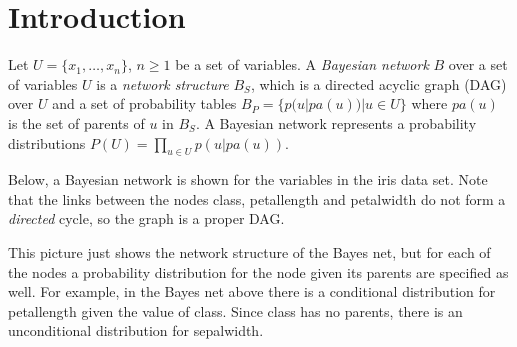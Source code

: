 %
%
%
%


\section{Introduction}

Let $U=\{x_1,\ldots,x_n\}$, $n\ge 1$ be a set of variables.
%
A {\em Bayesian network} $B$ over a set of variables $U$ is a {\em
network  structure} $B_S$, which is a directed acyclic graph (DAG)
over $U$ and a set of  probability tables $B_P = \{p(u|pa(u)) | u\in
U\}$ where $pa(u)$ is the set of parents of $u$ in $B_S$. A Bayesian
network represents a probability distributions $P(U) = \prod_{u\in
U}p(u|pa(u))$.

Below, a Bayesian network is shown for the variables in the iris data set.
Note that the links between the nodes class, petallength and petalwidth 
do not form a {\em directed} cycle, so the graph is a proper DAG.


\begin{center}
\end{center}

This picture just shows the network structure of the Bayes net, but for
each of the nodes a probability distribution for the node given its parents
are specified as well. For example, in the Bayes net above there is a conditional distribution
for petallength given the value of class. Since class has no
parents, there is an unconditional distribution for sepalwidth.


